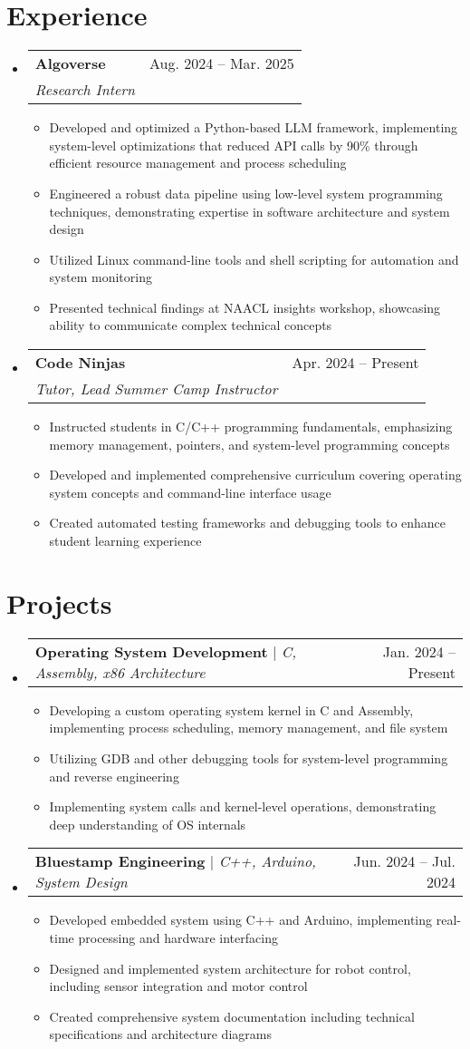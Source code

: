 \documentclass[letterpaper,11pt]{article}
\makeatletter
\newcommand{\resumeItem}[1]{
  \item\small{
    {#1 \vspace{-2pt}}
  }
}
\newcommand{\resumeSubheading}[4]{
  \vspace{-2pt}\item
    \begin{tabular*}{0.97\textwidth}[t]{l@{\extracolsep{\fill}}r}
      \textbf{#1} & #2 \\
      \textit{\small#3} & \textit{\small #4} \\
    \end{tabular*}\vspace{-7pt}
}
\newcommand{\resumeProjectHeading}[2]{
    \item
    \begin{tabular*}{0.97\textwidth}{l@{\extracolsep{\fill}}r}
      \small#1 & #2 \\
    \end{tabular*}\vspace{-7pt}
}
\newcommand{\resumeSubHeadingListStart}{\begin{itemize}[leftmargin=0.15in, label={}]}
\newcommand{\resumeSubHeadingListEnd}{\end{itemize}}
\newcommand{\resumeItemListStart}{\begin{itemize}}
\newcommand{\resumeItemListEnd}{\end{itemize}\vspace{-5pt}}
\makeatother
\begin{document}
\section{Experience}
  \resumeSubHeadingListStart
    \resumeSubheading
      {Algoverse}{Aug. 2024 -- Mar. 2025}
      {Research Intern}{}
      \resumeItemListStart
        \resumeItem{Developed and optimized a Python-based LLM framework, implementing system-level optimizations that reduced API calls by 90\% through efficient resource management and process scheduling}
        \resumeItem{Engineered a robust data pipeline using low-level system programming techniques, demonstrating expertise in software architecture and system design}
        \resumeItem{Utilized Linux command-line tools and shell scripting for automation and system monitoring}
        \resumeItem{Presented technical findings at NAACL insights workshop, showcasing ability to communicate complex technical concepts}
      \resumeItemListEnd

    \resumeSubheading
      {Code Ninjas}{Apr. 2024 -- Present}
      {Tutor, Lead Summer Camp Instructor}{}
      \resumeItemListStart
        \resumeItem{Instructed students in C/C++ programming fundamentals, emphasizing memory management, pointers, and system-level programming concepts}
        \resumeItem{Developed and implemented comprehensive curriculum covering operating system concepts and command-line interface usage}
        \resumeItem{Created automated testing frameworks and debugging tools to enhance student learning experience}
      \resumeItemListEnd

  \resumeSubHeadingListEnd


\section{Projects}
    \resumeSubHeadingListStart
      \resumeProjectHeading
          {\textbf{Operating System Development} $|$ \emph{C, Assembly, x86 Architecture}}{Jan. 2024 -- Present}
          \resumeItemListStart
            \resumeItem{Developing a custom operating system kernel in C and Assembly, implementing process scheduling, memory management, and file system}
            \resumeItem{Utilizing GDB and other debugging tools for system-level programming and reverse engineering}
            \resumeItem{Implementing system calls and kernel-level operations, demonstrating deep understanding of OS internals}
          \resumeItemListEnd
      \resumeProjectHeading
          {\textbf{Bluestamp Engineering} $|$ \emph{C++, Arduino, System Design}}{Jun. 2024 -- Jul. 2024}
          \resumeItemListStart
            \resumeItem{Developed embedded system using C++ and Arduino, implementing real-time processing and hardware interfacing}
            \resumeItem{Designed and implemented system architecture for robot control, including sensor integration and motor control}
            \resumeItem{Created comprehensive system documentation including technical specifications and architecture diagrams}
          \resumeItemListEnd
    \resumeSubHeadingListEnd
\end{document}
